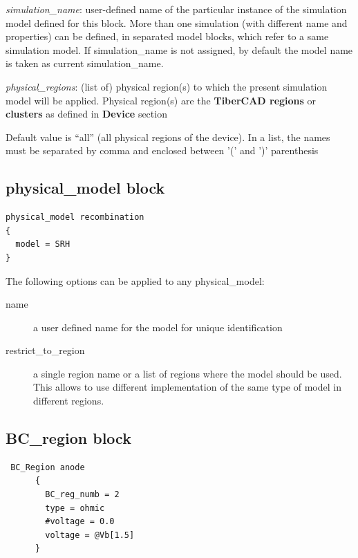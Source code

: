 \textit{simulation\_name}: user-defined name of the particular instance of  the simulation model defined for this block. More than one simulation (with different  name and properties) can be  defined, in separated model blocks, which refer to a same  \TiberCAD{}  simulation model. If simulation\_name is  not assigned,  by default the \TiberCAD{} model name is taken as current simulation\_name.

\textit{physical\_regions}: (list of) physical region(s) to  which the  present simulation model will be  applied.
Physical region(s) are the  \textbf{TiberCAD regions} or  \textbf{clusters} as  defined in  \textbf{Device}  section 

Default value  is  "`all"' (all  physical regions of the  device).
In a list, the names must be separated by comma  and  enclosed between '(' and ')' parenthesis 


\subsection{physical\_model block }

\begin{verbatim}
physical_model recombination
{
  model = SRH
}
\end{verbatim}


The following options can be applied to any physical\_model:
\begin{description}
  \item[name] a user defined name for the model for unique identification
  \item[restrict\_to\_region] a single region name or a list of regions where the model should be used. This allows to use different implementation of the same type of model in different regions.
\end{description}


\subsection{BC\_region block }
\label{section:BC}

\begin{verbatim}
 BC_Region anode
      {
        BC_reg_numb = 2
        type = ohmic
        #voltage = 0.0
        voltage = @Vb[1.5]
      }
\end{verbatim}



